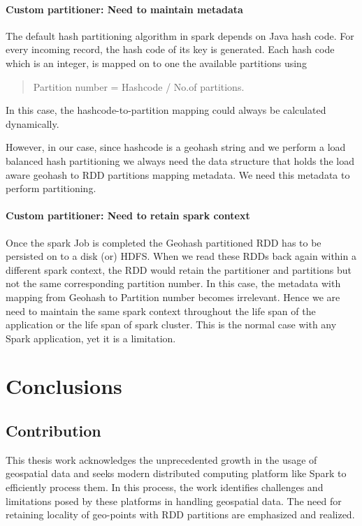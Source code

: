 \documentclass[article,type=msc,colorback,12pt,accentcolor=tud1d]{tudthesis}
\begin{document}
		 \paragraph{Custom partitioner: Need to maintain metadata}
		  \par The default hash partitioning algorithm in spark depends on Java hash code. For every incoming record, the hash code of its key is generated. Each hash code which is an integer, is mapped on to one the available partitions using 
				\begin{center}
					  \begin{quote}
				  	Partition number = Hashcode / No.of partitions. 
				  \end{quote}
				\end{center}
		  In this case, the hashcode-to-partition mapping could always be calculated dynamically.
		  
		  However, in our case, since hashcode is a geohash string and we perform a load balanced hash partitioning we always need the data structure that holds the load aware geohash to RDD partitions mapping metadata. We need this metadata to perform partitioning. 
		  
		  \paragraph{Custom partitioner: Need to retain spark context}
		  Once the spark Job is completed the Geohash partitioned RDD has to be persisted on to a disk (or) HDFS. When we read these RDDs back again within a different spark context, the RDD would retain the partitioner and partitions but not the same corresponding partition number. In this case, the metadata with mapping from Geohash to Partition number becomes irrelevant. Hence we are need to maintain the same spark context throughout the life span of the application or the life span of spark cluster. This is the normal case with any Spark application, yet it is a limitation.
		  
  \cleardoublepage
  
  \hfill
  \section{Conclusions}
  \hfill
		   \subsection{Contribution}
		   
		   This thesis work acknowledges the unprecedented growth in the usage of geospatial data and seeks modern distributed computing platform like Spark to efficiently process them. In this process, the work identifies challenges and limitations posed by these platforms in handling geospatial data. The need for retaining locality of geo-points with RDD partitions are emphasized and realized.
		   
\end{document}
